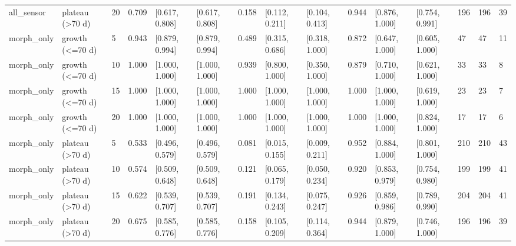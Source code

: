 \begin{tabular}{lllllllllllllll}
all\_sensor & plateau (>70 d) & 20 & 0.709 & [0.617, 0.808] & [0.617, 0.808] & 0.158 & [0.112, 0.211] & [0.104, 0.413] & 0.944 & [0.876, 1.000] & [0.754, 0.991] & 196 & 196 & 39 \\
morph\_only & growth (<=70 d) & 5 & 0.943 & [0.879, 0.994] & [0.879, 0.994] & 0.489 & [0.315, 0.686] & [0.318, 1.000] & 0.872 & [0.647, 1.000] & [0.605, 1.000] & 47 & 47 & 11 \\
morph\_only & growth (<=70 d) & 10 & 1.000 & [1.000, 1.000] & [1.000, 1.000] & 0.939 & [0.800, 1.000] & [0.350, 1.000] & 0.879 & [0.710, 1.000] & [0.621, 1.000] & 33 & 33 & 8 \\
morph\_only & growth (<=70 d) & 15 & 1.000 & [1.000, 1.000] & [1.000, 1.000] & 1.000 & [1.000, 1.000] & [1.000, 1.000] & 1.000 & [1.000, 1.000] & [0.619, 1.000] & 23 & 23 & 7 \\
morph\_only & growth (<=70 d) & 20 & 1.000 & [1.000, 1.000] & [1.000, 1.000] & 1.000 & [1.000, 1.000] & [1.000, 1.000] & 1.000 & [1.000, 1.000] & [0.824, 1.000] & 17 & 17 & 6 \\
morph\_only & plateau (>70 d) & 5 & 0.533 & [0.496, 0.579] & [0.496, 0.579] & 0.081 & [0.015, 0.155] & [0.009, 0.211] & 0.952 & [0.884, 1.000] & [0.801, 1.000] & 210 & 210 & 43 \\
morph\_only & plateau (>70 d) & 10 & 0.574 & [0.509, 0.648] & [0.509, 0.648] & 0.121 & [0.065, 0.179] & [0.050, 0.234] & 0.920 & [0.853, 0.979] & [0.754, 0.980] & 199 & 199 & 41 \\
morph\_only & plateau (>70 d) & 15 & 0.622 & [0.539, 0.707] & [0.539, 0.707] & 0.191 & [0.134, 0.243] & [0.075, 0.247] & 0.926 & [0.859, 0.986] & [0.789, 0.990] & 204 & 204 & 41 \\
morph\_only & plateau (>70 d) & 20 & 0.675 & [0.585, 0.776] & [0.585, 0.776] & 0.158 & [0.105, 0.209] & [0.114, 0.364] & 0.944 & [0.879, 1.000] & [0.746, 1.000] & 196 & 196 & 39 \\
\hline
\end{tabular}
